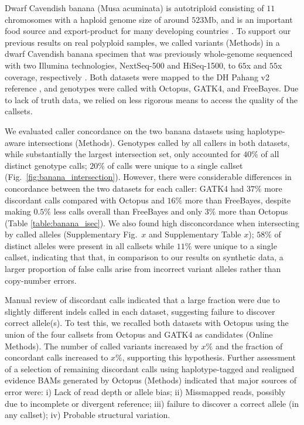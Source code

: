 \documentclass[notitlepage, twocolumn, 10pt]{article}
\begin{document}
Dwarf Cavendish banana (Musa acuminata) is autotriploid consisting of $11$ chromosomes with a haploid genome size of around $523$Mb, and is an important food source and export-product for many developing countries \cite{RN671}. To support our previous results on real polyploid samples, we called variants (Methods) in a dwarf Cavendish banana specimen that was previously whole-genome sequenced with two Illumina technologies, NextSeq-500 and HiSeq-1500, to $65$x and $55$x coverage, respectively \cite{RN670}. Both datasets were mapped to the DH Pahang v2 reference \cite{RN671}, and genotypes were called with Octopus, GATK4, and FreeBayes. Due to lack of truth data, we relied on less rigorous means to access the quality of the callsets.

We evaluated caller concordance on the two banana datasets using haplotype-aware intersections (Methods). Genotypes called by all callers in both datasets, while substantially the largest intersection set, only accounted for $40\%$ of all distinct genotype calls; $20\%$ of calls were unique to a single callset (Fig.\ \ref{fig:banana_intersection}). However, there were considerable differences in concordance between the two datasets for each caller: GATK4 had $37\%$ more discordant calls compared with Octopus and $16\%$ more than FreeBayes, despite making $0.5\%$ less calls overall than FreeBayes and only $3\%$ more than Octopus (Table \ref{table:banana_isec}). We also found high disconcordance when intersecting by called alleles (Supplementary Fig.\ $x$ and Supplementary Table $x$); $58\%$ of distinct alleles were present in all callsets while $11\%$ were unique to a single callset, indicating that that, in comparison to our results on synthetic data, a larger proportion of false calls arise from incorrect variant alleles rather than copy-number errors.

Manual review of discordant calls indicated that a large fraction were due to slightly different indels called in each dataset, suggesting failure to discover correct allele(s). To test this, we recalled both datasets with Octopus using the union of the four callsets from Octopus and GATK4 as candidates (Online Methods). The number of called variants increased by $x\%$ and the fraction of concordant calls increased to $x\%$, supporting this hypothesis. Further assessment of a selection of remaining discordant calls using haplotype-tagged and realigned evidence BAMs generated by Octopus (Methods) indicated that major sources of error were: i) Lack of read depth or allele bias; ii) Missmapped reads, possibly due to incomplete or divergent reference; iii) failure to discover a correct allele (in any callset); iv) Probable structural variation. 
\end{document}
